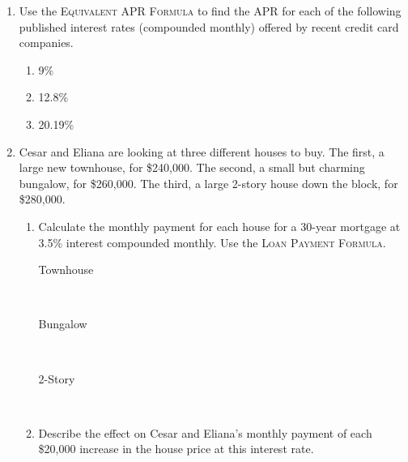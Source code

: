 \begin{enumerate}
\item Use the \textsc{Equivalent APR Formula} to find the APR for each of the following published interest rates (compounded monthly) offered by recent credit card companies.
\bigskip

\begin{enumerate}
\item 9\% \vfill
\item 12.8\%   \vfill
\item 20.19\% \vfill
\end{enumerate}

\newpage %

\item  Cesar and Eliana are looking at three different houses to buy.  The first, a large new townhouse, for \$240,000.  The second, a small but charming bungalow, for \$260,000.  The third, a large 2-story house down the block, for \$280,000. 
 \begin{enumerate}
\item Calculate the monthly payment for each house for a 30-year mortgage at 3.5\% interest compounded monthly.   Use the \textsc{Loan Payment Formula}. 
\bigskip

\begin{description}
\item[Townhouse] ~\vfill
\item [Bungalow] ~\vfill
\item [2-Story] ~\vfill
\end{description}
\item Describe the effect on Cesar and Eliana's monthly payment of each \$20,000 increase in the house price  at this interest rate. \vfill
\end{enumerate}

\end{enumerate}

